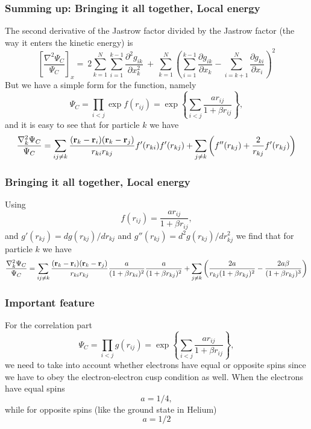 \documentclass[compress]{beamer}
\begin{document}
\frame
{
  \frametitle{Summing up: Bringing it all together, Local energy}
\begin{small}
{\scriptsize

The second derivative of the Jastrow factor divided by the Jastrow factor (the way it enters the kinetic energy) is
\[
\left[\frac{\nabla^2 \Psi_C}{\Psi_C}\right]_x =\  
2\sum_{k=1}^{N}
\sum_{i=1}^{k-1}\frac{\partial^2 g_{ik}}{\partial x_k^2}\ +\ 
\sum_{k=1}^N
\left(
\sum_{i=1}^{k-1}\frac{\partial g_{ik}}{\partial x_k} -
\sum_{i=k+1}^{N}\frac{\partial g_{ki}}{\partial x_i}
\right)^2
\]
But we have a simple form for the function, namely
\[
\Psi_{C}=\prod_{i< j}\exp{f(r_{ij})}= \exp{\left\{\sum_{i<j}\frac{ar_{ij}}{1+\beta r_{ij}}\right\}},
\]
and it is easy to see that for particle  $k$
we have
\[
  \frac{\nabla^2_k \Psi_C}{\Psi_C }=
\sum_{ij\ne k}\frac{({\bf r}_k-{\bf r}_i)({\bf r}_k-{\bf r}_j)}{r_{ki}r_{kj}}f'(r_{ki})f'(r_{kj})+
\sum_{j\ne k}\left( f''(r_{kj})+\frac{2}{r_{kj}}f'(r_{kj})\right)
\]
}
\end{small}
}



\frame
{
  \frametitle{Bringing it all together, Local energy}
\begin{small}
{\scriptsize
Using 
\[
f(r_{ij})= \frac{ar_{ij}}{1+\beta r_{ij}},
\]
and $g'(r_{kj})=dg(r_{kj})/dr_{kj}$ and 
$g''(r_{kj})=d^2g(r_{kj})/dr_{kj}^2$  we find that for particle  $k$
we have
\[
  \frac{\nabla^2_k \Psi_C}{\Psi_C }=
\sum_{ij\ne k}\frac{({\bf r}_k-{\bf r}_i)({\bf r}_k-{\bf r}_j)}{r_{ki}r_{kj}}\frac{a}{(1+\beta r_{ki})^2}
\frac{a}{(1+\beta r_{kj})^2}+
\sum_{j\ne k}\left(\frac{2a}{r_{kj}(1+\beta r_{kj})^2}-\frac{2a\beta}{(1+\beta r_{kj})^3}\right)
\]
}
\end{small}
}

\frame
{
  \frametitle{Important feature}
\begin{small}
{\scriptsize
For the correlation part 
\[
\Psi_C=\prod_{i< j}g(r_{ij})= \exp{\left\{\sum_{i<j}\frac{ar_{ij}}{1+\beta r_{ij}}\right\}},
\]
we need to take into account whether electrons have equal or opposite spins since we have to obey the
electron-electron cusp condition as well.  
When the electrons have  equal spins 
\[
a= 1/4,
\]
while for opposite spins (like the ground state in Helium)
\[
a= 1/2
\] 
}
\end{small}
}
\end{document}
